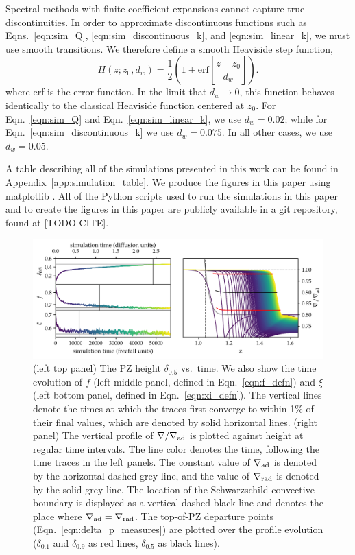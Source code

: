 \documentclass[twocolumn]{aastex631}
\newcommand{\gradrad}{\ensuremath{\nabla_{\rm{rad}}}}
\newcommand{\gradad}{\ensuremath{\nabla_{\rm{ad}}}}
\newcommand{\justgrad}{\ensuremath{\nabla}}
\begin{document}
Spectral methods with finite coefficient expansions cannot capture true discontinuities.
In order to approximate discontinuous functions such as Eqns.~\ref{eqn:sim_Q}, \ref{eqn:sim_discontinuous_k}, and \ref{eqn:sim_linear_k}, we must use smooth transitions.
We therefore define a smooth Heaviside step function,
\begin{equation}
H(z; z_0, d_w) = \frac{1}{2}\left(1 + \mathrm{erf}\left[\frac{z - z_0}{d_w}\right]\right).
\label{eqn:heaviside}
\end{equation}
where erf is the error function.
In the limit that $d_w \rightarrow 0$, this function behaves identically to the classical Heaviside function centered at $z_0$.
For Eqn.~\ref{eqn:sim_Q} and Eqn.~\ref{eqn:sim_linear_k}, we use $d_w = 0.02$; while for Eqn.~\ref{eqn:sim_discontinuous_k} we use $d_w = 0.075$.
In all other cases, we use $d_w = 0.05$.

A table describing all of the simulations presented in this work can be found in Appendix~\ref{app:simulation_table}.
We produce the figures in this paper using matplotlib \citep{hunter2007, mpl3.3.4}.
All of the Python scripts used to run the simulations in this paper and to create the figures in this paper are publicly available in a git repository, found at [TODO CITE].

\begin{figure}[t]
\centering
\includegraphics[width=\textwidth]{time_evolution.pdf}
\caption{
(left top panel) The PZ height $\delta_{0.5}$ vs.~time.
We also show the time evolution of $f$ (left middle panel, defined in Eqn.~\ref{eqn:f_defn}) and $\xi$ (left bottom panel, defined in Eqn.~\ref{eqn:xi_defn}).
The vertical lines denote the times at which the traces first converge to within 1\% of their final values, which are denoted by solid horizontal lines.
(right panel) The vertical profile of $\justgrad/\gradad$ is plotted against height at regular time intervals.
The line color denotes the time, following the time traces in the left panels.
The constant value of $\gradad$ is denoted by the horizontal dashed grey line, and the value of $\gradrad$ is denoted by the solid grey line.
The location of the Schwarzschild convective boundary is displayed as a vertical dashed black line and denotes the place where $\gradad = \gradrad$.
The top-of-PZ departure points (Eqn.~\ref{eqn:delta_p_measures}) are plotted over the profile evolution ($\delta_{0.1}$ and $\delta_{0.9}$ as red lines, $\delta_{0.5}$ as black lines).
\label{fig:time_evolution}
}
\end{figure}
\end{document}
